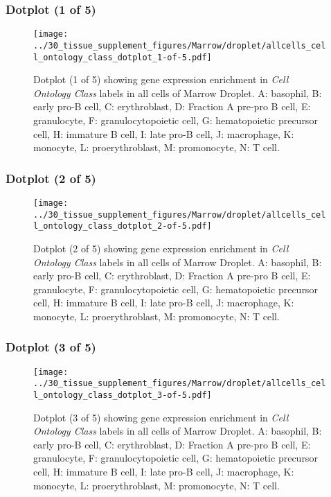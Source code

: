 \clearpage

\subsubsection{Dotplot (1 of 5)}
\begin{figure}[h]
\centering
\texttt{[image: ../30\_tissue\_supplement\_figures/Marrow/droplet/allcells\_cell\_ontology\_class\_dotplot\_1-of-5.pdf]}

\caption{ Dotplot (1 of 5)  showing gene expression enrichment in \emph{Cell Ontology Class} labels in all cells of Marrow Droplet. A: basophil, B: early pro-B cell, C: erythroblast, D: Fraction A pre-pro B cell, E: granulocyte, F: granulocytopoietic cell, G: hematopoietic precursor cell, H: immature B cell, I: late pro-B cell, J: macrophage, K: monocyte, L: proerythroblast, M: promonocyte, N: T cell.}
\end{figure}


\clearpage

\subsubsection{Dotplot (2 of 5)}
\begin{figure}[h]
\centering
\texttt{[image: ../30\_tissue\_supplement\_figures/Marrow/droplet/allcells\_cell\_ontology\_class\_dotplot\_2-of-5.pdf]}

\caption{ Dotplot (2 of 5)  showing gene expression enrichment in \emph{Cell Ontology Class} labels in all cells of Marrow Droplet. A: basophil, B: early pro-B cell, C: erythroblast, D: Fraction A pre-pro B cell, E: granulocyte, F: granulocytopoietic cell, G: hematopoietic precursor cell, H: immature B cell, I: late pro-B cell, J: macrophage, K: monocyte, L: proerythroblast, M: promonocyte, N: T cell.}
\end{figure}


\clearpage

\subsubsection{Dotplot (3 of 5)}
\begin{figure}[h]
\centering
\texttt{[image: ../30\_tissue\_supplement\_figures/Marrow/droplet/allcells\_cell\_ontology\_class\_dotplot\_3-of-5.pdf]}

\caption{ Dotplot (3 of 5)  showing gene expression enrichment in \emph{Cell Ontology Class} labels in all cells of Marrow Droplet. A: basophil, B: early pro-B cell, C: erythroblast, D: Fraction A pre-pro B cell, E: granulocyte, F: granulocytopoietic cell, G: hematopoietic precursor cell, H: immature B cell, I: late pro-B cell, J: macrophage, K: monocyte, L: proerythroblast, M: promonocyte, N: T cell.}
\end{figure}


